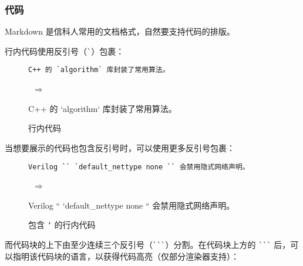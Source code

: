 \documentclass[a4paper,fontset=none]{ctexart}
\begin{document}
\subsubsection{代码}

Markdown 是信科人常用的文档格式，自然要支持代码的排版。

行内代码使用反引号（\verb|`|）包裹：

\begin{figure}[H]
    \centering
    \begin{minipage}{0.45\textwidth}
        \begin{verbatim}
C++ 的 `algorithm` 库封装了常用算法。
        \end{verbatim}
    \end{minipage}
    \, $\Longrightarrow$ \,
    \begin{minipage}{0.45\textwidth}
\begin{markdown}
C++ 的 `algorithm` 库封装了常用算法。
\end{markdown}
    \end{minipage}
    \caption{行内代码}
\end{figure}

当想要展示的代码也包含反引号时，可以使用更多反引号包裹：

\begin{figure}[H]
    \centering
    \begin{minipage}{0.45\textwidth}
        \begin{verbatim}
Verilog `` `default_nettype none `` 会禁用隐式网络声明。
        \end{verbatim}
    \end{minipage}
    \, $\Longrightarrow$ \,
    \begin{minipage}{0.45\textwidth}
\begin{markdown}
Verilog `` `default_nettype none `` 会禁用隐式网络声明。
\end{markdown}
    \end{minipage}
    \caption{包含 \texttt{`} 的行内代码}
\end{figure}

而代码块的上下由至少连续三个反引号（\verb|```|）分割。在代码块上方的 \verb|```| 后，可以指明该代码块的语言，以获得代码高亮（仅部分渲染器支持）：
\end{document}
